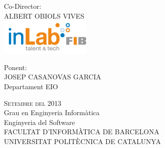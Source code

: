 \begin{titlepage}
\begin{center}
\begin{minipage}{0.30\textwidth}
\begin{flushleft}
        \end{flushleft}
    \end{minipage}
    \begin{minipage}{0.30\textwidth}
        \begin{flushleft}
            Co-Director:                                                \\[0.6\baselineskip]
            ALBERT OBIOLS VIVES                                         \\[0.6\baselineskip]
            \includegraphics[scale=0.4]{NotDef/logo_inlab.png}          \\
        \end{flushleft}
    \end{minipage}
    \begin{minipage}{0.30\textwidth}
        \begin{flushleft} 
            Ponent:                                                     \\[1\baselineskip]
            JOSEP CASANOVAS GARCIA                                      \\[1\baselineskip]
            \small{Departament EIO}                                     \\[0.7\baselineskip]
        \end{flushleft}
    \end{minipage}
    \vfill
    {\huge\scshape Setembre del 2013}                                   \\[2.0\baselineskip]
    {\large Grau en Enginyeria Informàtica}                             \\[0.3\baselineskip]
    {\large Enginyeria del Software}                                    \\[1.5\baselineskip]
    {\large FACULTAT D'INFORMÀTICA DE BARCELONA}                        \\[0.3\baselineskip]
    {\large UNIVERSITAT POLITÈCNICA DE CATALUNYA}
\end{center}
\end{titlepage}

\setlength{\parskip}{12pt}

\tableofcontents

\newpage


\newpage


\newpage


\newpage


\newpage
   
\newpage
   


